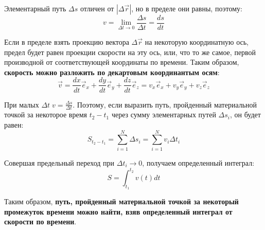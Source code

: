 \documentclass{article}
\begin{document}
      \par
      Элементарный путь $\Delta s$ отличен от $|\Delta \vec r|$, но в пределе они равны, поэтому:
      \begin{equation}
	v=\lim_{\Delta t\rightarrow 0}{\frac{\Delta s}{\Delta t}}=\frac{ds}{dt}
      \end{equation}
      \par
      Если в пределе взять проекцию вектора $\Delta \vec r$ на некоторую координатную ось, предел будет равен проекции скорости на эту ось, или, что то же самое, первой производной от соответствующей координаты по времени. Таким образом, \textbf{скорость можно разложить по декартовым координантым осям}:
      \begin{equation}
	\vec v = \frac{dx}{dt}\vec e_x+\frac{dy}{dt}\vec e_y+\frac{dz}{dt}\vec e_z = v_x\vec e_x+v_y\vec e_y+v_z\vec e_z
      \end{equation}
      \par
      При малых $\Delta t \; v=\frac{\Delta s}{\Delta t}$. Поэтому, если выразить путь, пройденный материальной точкой за некоторое время $t_2-t_1$ через сумму элементарных путей $\Delta s_i$, он будет равен:
      \begin{equation}
	S_{t_2-t_1}=\sum^{N}_{i=1}{\Delta s_i}=\sum^{N}_{i=1}{v_i\Delta t_i}
      \end{equation}
      \par
      Совершая предельный переход при $\Delta t_i\rightarrow 0$, получаем определенный интеграл:
      \begin{equation}
	S=\int^{t_2}_{t_1}v(t)dt
      \end{equation}
      \par
      Таким образом, \textbf{путь, пройденный материальной точкой за некоторый промежуток времени можно найти, взяв определенный интеграл от скорости по времени}.
  \clearpage
    
\end{document}
